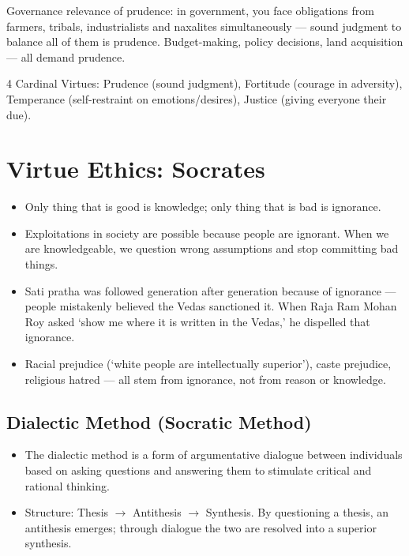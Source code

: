 \begin{CriticalPoint}
Governance relevance of prudence: in government, you face obligations from farmers, tribals, industrialists and naxalites simultaneously --- sound judgment to balance all of them is prudence. Budget-making, policy decisions, land acquisition --- all demand prudence.
\end{CriticalPoint}

\begin{QuickRevision}
4 Cardinal Virtues: Prudence (sound judgment), Fortitude (courage in adversity), Temperance (self-restraint on emotions/desires), Justice (giving everyone their due).
\end{QuickRevision}

\section{Virtue Ethics: Socrates}

\begin{KeyConcept}
\begin{itemize}
\item Only thing that is good is knowledge; only thing that is bad is ignorance.
\item Exploitations in society are possible because people are ignorant. When we are knowledgeable, we question wrong assumptions and stop committing bad things.
\end{itemize}
\end{KeyConcept}

\begin{ExampleBox}
\begin{itemize}
\item Sati pratha was followed generation after generation because of ignorance --- people mistakenly believed the Vedas sanctioned it. When Raja Ram Mohan Roy asked `show me where it is written in the Vedas,' he dispelled that ignorance.
\item Racial prejudice (`white people are intellectually superior'), caste prejudice, religious hatred --- all stem from ignorance, not from reason or knowledge.
\end{itemize}
\end{ExampleBox}

\subsection*{Dialectic Method (Socratic Method)}
\begin{KeyConcept}
\begin{itemize}
\item The dialectic method is a form of argumentative dialogue between individuals based on asking questions and answering them to stimulate critical and rational thinking.
\item Structure: Thesis $\rightarrow$ Antithesis $\rightarrow$ Synthesis. By questioning a thesis, an antithesis emerges; through dialogue the two are resolved into a superior synthesis.
\end{itemize}
\end{KeyConcept}

